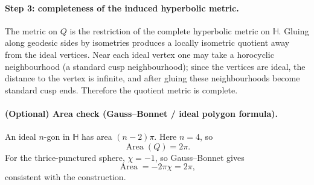 \documentclass[12pt,a4paper]{article}
\DeclareMathOperator{\Area}{Area}
\newcommand{\HH}{\mathbb{H}}
\theoremstyle{plain}
\theoremstyle{definition}      %
\begin{document}
	\paragraph{Step 3: completeness of the induced hyperbolic metric.}
	The metric on $Q$ is the restriction of the complete hyperbolic metric on $\HH$.
	Gluing along geodesic sides by isometries produces a locally isometric quotient away from the ideal vertices.
	Near each ideal vertex one may take a horocyclic neighbourhood (a standard cusp neighbourhood); since the vertices are ideal,
	the distance to the vertex is infinite, and after gluing these neighbourhoods become standard cusp ends.
	Therefore the quotient metric is complete.
	
	\paragraph{(Optional) Area check (Gauss--Bonnet / ideal polygon formula).}
	An ideal $n$-gon in $\HH$ has area $(n-2)\pi$. Here $n=4$, so
	\[
	\Area(Q)=2\pi.
	\]
	For the thrice-punctured sphere, $\chi=-1$, so Gauss--Bonnet gives
	\[
	\Area = -2\pi\chi = 2\pi,
	\]
	consistent with the construction.
	
\end{document}

